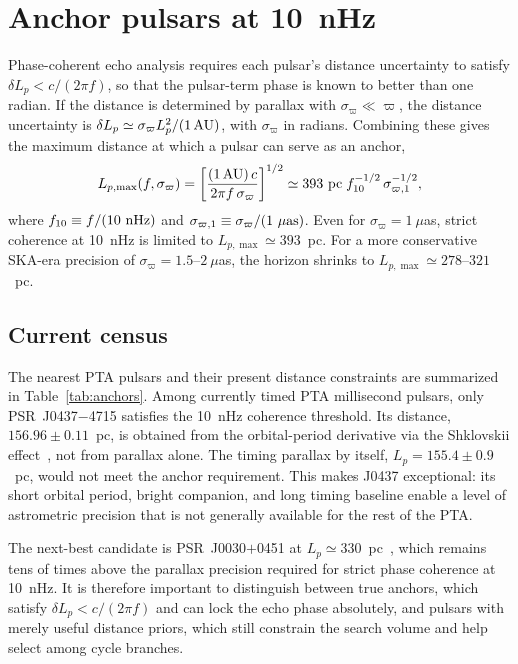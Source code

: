 \documentclass[aps,prx,twocolumn,superscriptaddress,nofootinbib,longbibliography]{revtex4-2}
\begin{document}
\section{Anchor pulsars at 10~nHz}\label{app:anchors}

Phase-coherent echo analysis requires each pulsar's distance uncertainty to satisfy $\delta L_p < c/(2\pi f)$, so that the pulsar-term phase is known to better than one radian. If the distance is determined by parallax with $\sigma_\varpi \ll \varpi$, the distance uncertainty is $\delta L_p \simeq \sigma_\varpi L_p^2/(1\,{\rm AU})$, with $\sigma_\varpi$ in radians. Combining these gives the maximum distance at which a pulsar can serve as an anchor,
\begin{equation}\label{eq:dmax_anchor}
L_{p,\max}(f,\sigma_\varpi)
= \left[\frac{(1\,{\rm AU})\,c}{2\pi f\,\sigma_\varpi}\right]^{1/2}
\simeq 393~{\rm pc}\;
f_{10}^{-1/2}\,\sigma_{\varpi,1}^{-1/2},
\end{equation}
where $f_{10}\equiv f/(10~{\rm nHz})$ and $\sigma_{\varpi,1}\equiv \sigma_\varpi/(1~\mu{\rm as})$. Even for $\sigma_\varpi=1~\mu$as, strict coherence at 10~nHz is limited to $L_{p,\max}\simeq393$~pc. For a more conservative SKA-era precision of $\sigma_\varpi=1.5$--$2~\mu$as, the horizon shrinks to $L_{p,\max}\simeq278$--$321$~pc.

\subsection{Current census}\label{app:census}

The nearest PTA pulsars and their present distance constraints are summarized in Table~\ref{tab:anchors}. Among currently timed PTA millisecond pulsars, only PSR~J0437$-$4715 satisfies the 10~nHz coherence threshold. Its distance, $156.96\pm0.11$~pc, is obtained from the orbital-period derivative via the Shklovskii effect~\cite{Reardon2024}, not from parallax alone. The timing parallax by itself, $L_p=155.4\pm0.9$~pc, would not meet the anchor requirement. This makes J0437 exceptional: its short orbital period, bright companion, and long timing baseline enable a level of astrometric precision that is not generally available for the rest of the PTA.

The next-best candidate is PSR~J0030$+$0451 at $L_p\simeq330$~pc~\cite{Ding2023}, which remains tens of times above the parallax precision required for strict phase coherence at 10~nHz. It is therefore important to distinguish between true anchors, which satisfy $\delta L_p<c/(2\pi f)$ and can lock the echo phase absolutely, and pulsars with merely useful distance priors, which still constrain the search volume and help select among cycle branches.
\end{document}
